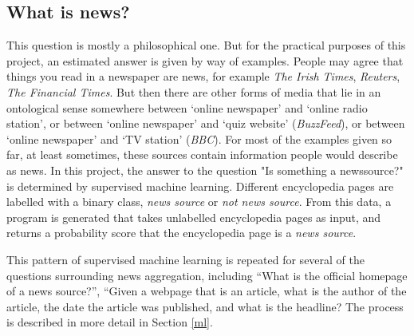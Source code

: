 \subsection{What is news?}
This question is mostly a philosophical one.  But for the practical
purposes of this project, an estimated answer is given by way of examples.
People may agree that things you read in a newspaper are news,
for example {\it The Irish Times}, {\it Reuters}, {\it The Financial
Times}.  But then there are other forms of media that lie in
an ontological sense somewhere between `online newspaper' and
`online radio station', or between `online newspaper' and
`quiz website' ({\it BuzzFeed}), or between `online newspaper' and
`TV station' ({\it BBC}).  For most of the examples given so far, at least
sometimes, these sources contain information people would describe as
news.  In this project, the answer to the question "Is something a
newssource?" is determined by supervised machine learning.  Different
encyclopedia pages are labelled with a binary class, {\it news source} or
{\it not news source}.  From this data, a program is generated that
takes unlabelled encyclopedia pages as input, and returns a probability
score that the encyclopedia page is a {\it news source}.

This pattern of supervised machine learning is repeated for several of the
questions surrounding news aggregation, including ``What is the
official homepage of a news source?'', ``Given a webpage that is an
article, what is the author of the article, the date the article was
published, and what is the headline?  The process is described in
more detail in Section \ref{ml}.